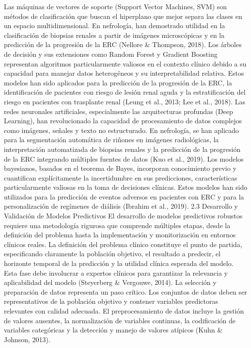 \documentclass{article}
\begin{document}
\begin{multicols}{2}
Las máquinas de vectores de soporte (Support Vector Machines, SVM) son métodos de clasificación que buscan el hiperplano que mejor separa las clases en un espacio multidimensional. En nefrología, han demostrado utilidad en la clasificación de biopsias renales a partir de imágenes microscópicas y en la predicción de la progresión de la ERC (Nellore \& Thompson, 2018).
Los árboles de decisión y sus extensiones como Random Forest y Gradient Boosting representan algoritmos particularmente valiosos en el contexto clínico debido a su capacidad para manejar datos heterogéneos y su interpretabilidad relativa. Estos modelos han sido aplicados para la predicción de la progresión de la ERC, la identificación de pacientes con riesgo de lesión renal aguda y la estratificación del riesgo en pacientes con trasplante renal (Leung et al., 2013; Lee et al., 2018).
Las redes neuronales artificiales, especialmente las arquitecturas profundas (Deep Learning), han revolucionado la capacidad de procesamiento de datos complejos como imágenes, señales y texto no estructurado. En nefrología, se han aplicado para la segmentación automática de riñones en imágenes radiológicas, la interpretación automatizada de biopsias renales y la predicción de la progresión de la ERC integrando múltiples fuentes de datos (Kuo et al., 2019).
Los modelos bayesianos, basados en el teorema de Bayes, incorporan conocimiento previo y cuantifican explícitamente la incertidumbre en sus predicciones, características particularmente valiosas en la toma de decisiones clínicas. Estos modelos han sido utilizados para la predicción de eventos adversos en pacientes con ERC y para la personalización de regímenes de diálisis (Ibrahim et al., 2019).
 2.3 Desarrollo y Validación de Modelos Predictivos
El desarrollo de modelos predictivos robustos requiere una metodología rigurosa que comprende múltiples etapas, desde la definición del problema hasta la implementación y monitorización en entornos clínicos reales.
La definición del problema clínico constituye el punto de partida, especificando claramente la población objetivo, el resultado a predecir, el horizonte temporal de la predicción y la utilidad clínica esperada del modelo. Esta fase debe involucrar a expertos clínicos para garantizar la relevancia y aplicabilidad del modelo (Steyerberg \& Vergouwe, 2014).
La selección y preparación de datos representa un paso crítico. Los conjuntos de datos deben ser representativos de la población objetivo y contener variables predictoras relevantes con calidad adecuada. El preprocesamiento de datos incluye la gestión de valores ausentes, la normalización de variables continuas, la codificación de variables categóricas y la detección y manejo de valores atípicos (Kuhn \& Johnson, 2013).

\end{multicols}
\end{document}
